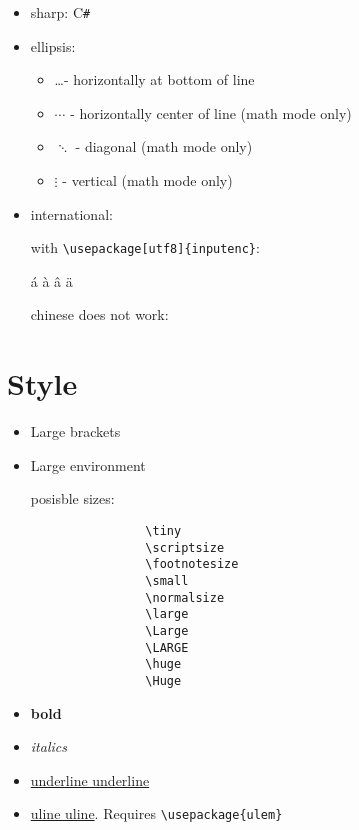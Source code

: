 \documentclass[12pt]{article}
\begin{document}
    \begin{itemize}
        \item sharp: C\verb|#|

        \item ellipsis:
        \begin{itemize}
            \item    \ldots - horizontally at bottom of line
            \item    $\cdots$ - horizontally center of line (math mode only)
            \item    $\ddots$ - diagonal (math mode only)
            \item    $\vdots$ - vertical (math mode only)
        \end{itemize}

        \item international:

            with \lstinline|\usepackage[utf8]{inputenc}|:

            á à â ä

            chinese does not work: %

    \end{itemize}

\section{Style}\label{style}

    \begin{itemize}

        \item {\Large Large brackets}
        \item \begin{Large}Large environment\end{Large}

            posisble sizes:
            \begin{lstlisting}
                \tiny
                \scriptsize
                \footnotesize
                \small
                \normalsize
                \large
                \Large
                \LARGE
                \huge
                \Huge
            \end{lstlisting}
        \item \textbf{bold}
        \item \textit{italics}
        \item \underline{underline underline}
        \item \uline{uline uline}. Requires \lstinline|\usepackage{ulem}|

    \end{itemize}
\end{document}
